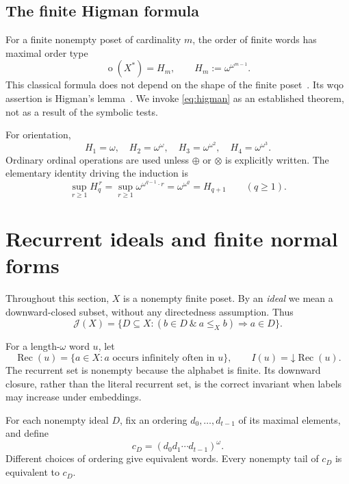 \documentclass[11pt]{article}
\numberwithin{equation}{section}
\theoremstyle{plain}
\theoremstyle{definition}
\theoremstyle{remark}
\newcommand{\ot}{\operatorname{o}}
\newcommand{\J}{\mathcal J}
\newcommand{\HH}{H}
\newcommand{\rec}{\operatorname{Rec}}
\newcommand{\down}{\mathord\downarrow}
\begin{document}
\subsection{The finite Higman formula}

For a finite nonempty poset of cardinality $m$, the order of finite words has maximal order type
\begin{equation}\label{eq:higman}
 \ot(X^*)=\HH_m,
 \qquad \HH_m:=\omega^{\omega^{m-1}}.
\end{equation}
This classical formula does not depend on the shape of the finite poset~\cite{DJP,Schmidt}. Its wqo assertion is Higman's lemma~\cite{Higman}. We invoke \eqref{eq:higman} as an established theorem, not as a result of the symbolic tests.

For orientation,
\[
 \HH_1=\omega,
 \quad \HH_2=\omega^\omega,
 \quad \HH_3=\omega^{\omega^2},
 \quad \HH_4=\omega^{\omega^3}.
\]
Ordinary ordinal operations are used unless $\oplus$ or $\otimes$ is explicitly written. The elementary identity driving the induction is
\begin{equation}\label{eq:amplification}
 \sup_{r\geq1}\HH_q^{\,r}
 =\sup_{r\geq1}\omega^{\omega^{q-1}\cdot r}
 =\omega^{\omega^q}
 =\HH_{q+1}\qquad(q\geq1).
\end{equation}

\section{Recurrent ideals and finite normal forms}\label{sec:normal}

Throughout this section, $X$ is a nonempty finite poset. By an \emph{ideal} we mean a downward-closed subset, without any directedness assumption. Thus
\[
 \J(X)=\{D\subseteq X:(b\in D\ \&\ a\leq_X b)\Longrightarrow a\in D\}.
\]

For a length-$\omega$ word $u$, let
\[
 \rec(u)=\{a\in X:a\text{ occurs infinitely often in }u\},
 \qquad
 I(u)=\down\rec(u).
\]
The recurrent set is nonempty because the alphabet is finite. Its downward closure, rather than the literal recurrent set, is the correct invariant when labels may increase under embeddings.

For each nonempty ideal $D$, fix an ordering $d_0,\ldots,d_{t-1}$ of its maximal elements, and define
\begin{equation}\label{eq:cD}
 c_D=(d_0d_1\cdots d_{t-1})^\omega.
\end{equation}
Different choices of ordering give equivalent words. Every nonempty tail of $c_D$ is equivalent to $c_D$.
\end{document}
